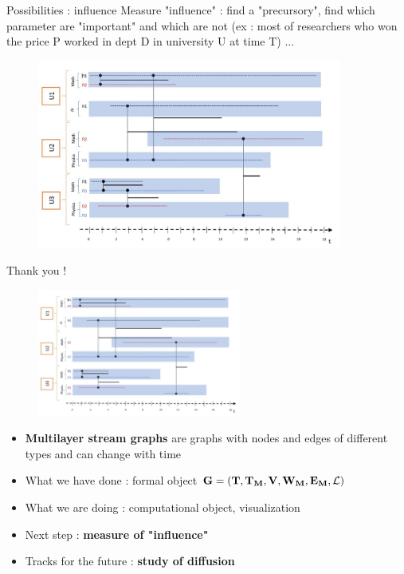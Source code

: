 \documentclass[15pt]{beamer}
\begin{document}
\begin{frame}{Possibilities : influence}%
	Measure "influence" : find a "precursory", find which parameter are "important" and which are not (ex : most of researchers who won the price P worked in dept D in university U at time T) ...
	\begin{figure}
		\centering
		\includegraphics[width=10cm]{img/chercheurs.jpg}
		\label{influ}
	\end{figure}
\end{frame}



\begin{frame}{Thank you !}
	\begin{figure}
		\includegraphics[width=0.6\textwidth]{img/chercheurs.jpg}
	\end{figure}
	\begin{itemize}
		\item \textbf{Multilayer stream graphs} are graphs with nodes and edges of different types and can change with time
		\item What we have done : formal object $\mathbf{G=(T,T_M,V,W_M,E_M,\cal{L})}$
		\item What we are doing : computational object, visualization
		\item Next step : \textbf{measure of "influence"}
		\item Tracks for the future : \textbf{study of diffusion}
	\end{itemize}
	
\end{frame}
\end{document}
